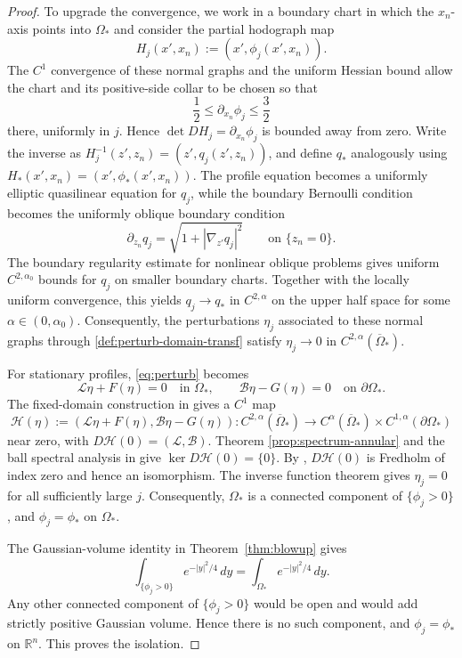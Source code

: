 \documentclass[11pt]{article}
\numberwithin{equation}{section}
\theoremstyle{definition}
\newcommand{\RR}{\mathbb{R}}
\begin{document}
\begin{proof}
To upgrade the convergence, we work in a boundary chart in which the $x_n$-axis
points into $\Omega_*$ and consider the partial hodograph map
\[
    H_j(x',x_n):=(x',\phi_j(x',x_n)).
\]
The $C^1$ convergence of these normal graphs and the uniform Hessian bound
allow the chart and its positive-side collar to be chosen so that
\[
    \frac12\leq\partial_{x_n}\phi_j\leq\frac32
\]
there, uniformly in $j$. Hence $\det DH_j=\partial_{x_n}\phi_j$ is bounded away
from zero. Write the inverse as $H^{-1}_j(z',z_n)=(z',q_j(z',z_n))$, and define $q_*$ analogously using $H_*(x',x_n)=(x',\phi_*(x',x_n))$. The profile equation becomes a uniformly
elliptic quasilinear equation for $q_j$, while the boundary Bernoulli condition becomes
the uniformly oblique boundary condition
\[
    \partial_{z_n}q_j
    =\sqrt{1+|\nabla_{z'}q_j|^2}
    \qquad\text{on $\{z_n=0\}$}.
\]
The boundary regularity estimate for nonlinear oblique problems
\cite[Theorem~6.2 and the following remark]{LT} gives uniform
$C^{2,\alpha_0}$ bounds for $q_j$ on smaller boundary charts.
Together with
the locally uniform convergence, this yields $q_j\to q_*$ in $C^{2,\alpha}$ on the upper half space for some
$\alpha\in(0,\alpha_0)$. Consequently, the perturbations $\eta_j$ associated to these normal graphs through
\eqref{def:perturb-domain-transf} satisfy
$\eta_j\to0$ in $C^{2,\alpha}(\overline\Omega_*)$.

For stationary profiles, \eqref{eq:perturb} becomes
\[
    \mathscr L\eta+F(\eta)=0\quad\text{in $\Omega_*$},
    \qquad
    \mathscr B\eta-G(\eta)=0\quad\text{on $\partial\Omega_*$}.
\]
The fixed-domain construction in \cite[Sections~2--3]{stability} gives a
$C^1$ map
\[
\mathcal H(\eta):=(\mathscr L\eta+F(\eta),\mathscr B\eta-G(\eta))
\colon C^{2,\alpha}(\overline\Omega_*)
\longrightarrow C^\alpha(\overline\Omega_*)\times C^{1,\alpha}(\partial\Omega_*)
\]
near zero, with $D\mathcal H(0)=(\mathscr L,\mathscr B)$. Theorem
\ref{prop:spectrum-annular} and the ball spectral analysis in
\cite[Section~4.2]{stability} give
$\ker D\mathcal H(0)=\{0\}$. By
\cite[Theorem~2.30]{Lieberman}, $D\mathcal  H(0)$ is Fredholm of index zero and
hence an isomorphism. The inverse function theorem gives
$\eta_j=0$ for all sufficiently large $j$. Consequently, $\Omega_*$ is a
connected component of $\{\phi_j>0\}$, and $\phi_j=\phi_*$ on $\Omega_*$.

The Gaussian-volume identity in Theorem~\ref{thm:blowup} gives
\[
    \int_{\{\phi_j>0\}}e^{-|y|^2/4}\,dy
    =\int_{\Omega_*}e^{-|y|^2/4}\,dy.
\]
Any other connected component of $\{\phi_j>0\}$ would be open and would add
strictly positive Gaussian volume. Hence there is no such component, and
$\phi_j=\phi_*$ on $\RR^n$. This proves the isolation.
\end{proof}
\end{document}
